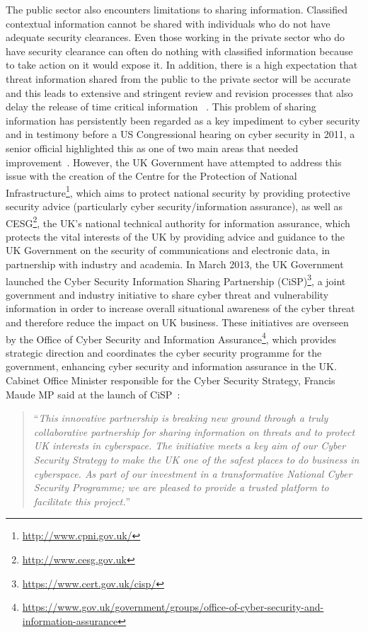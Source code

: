 \documentclass[a4paper,11pt]{article}
\begin{document}
The public sector also encounters limitations to sharing
information. Classified contextual information cannot be shared with
individuals who do not have adequate security clearances. Even those
working in the private sector who do have security clearance can often
do nothing with classified information because to take action on it
would expose it. In addition, there is a high expectation that threat
information shared from the public to the private sector will be
accurate and this leads to extensive and stringent review and revision
processes that also delay the release of time critical information
~\cite{usgao:2010}.  This problem of sharing information has
persistently been regarded as a key impediment to cyber security and
in testimony before a US Congressional hearing on cyber security in
2011, a senior official highlighted this as one of two main areas that
needed improvement~\cite{wilshusen:2011}. However, the UK Government
have attempted to address this issue with the creation of the Centre
for the Protection of National
Infrastructure\footnote{\url{http://www.cpni.gov.uk/}}, which aims to
protect national security by providing protective security advice
(particularly cyber security/information assurance), as well as
CESG\footnote{\url{http://www.cesg.gov.uk}}, the UK's national
technical authority for information assurance, which protects the
vital interests of the UK by providing advice and guidance to the UK
Government on the security of communications and electronic data, in
partnership with industry and academia. In March 2013, the UK
Government launched the Cyber Security Information Sharing Partnership
(CiSP)\footnote{\url{https://www.cert.gov.uk/cisp/}}, a joint
government and industry initiative to share cyber threat and
vulnerability information in order to increase overall situational
awareness of the cyber threat and therefore reduce the impact on UK
business. These initiatives are overseen by the Office of Cyber
Security and Information
Assurance\footnote{\url{https://www.gov.uk/government/groups/office-of-cyber-security-and-information-assurance}},
which provides strategic direction and coordinates the cyber security
programme for the government, enhancing cyber security and information
assurance in the UK. Cabinet Office Minister responsible for the Cyber
Security Strategy, Francis Maude MP said at the launch of
CiSP~\cite{caboff:2013}:

\begin{quotation}
\noindent ``{\emph{This innovative partnership is breaking new ground through a truly
collaborative partnership for sharing information on threats and to
protect UK interests in cyberspace. The initiative meets a key aim of
our Cyber Security Strategy to make the UK one of the safest places to
do business in cyberspace. As part of our investment in a
transformative National Cyber Security Programme; we are pleased to
provide a trusted platform to facilitate this project.}}''
\end{quotation}
\end{document}
